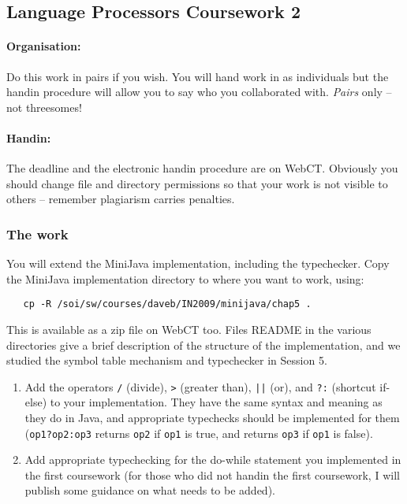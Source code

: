 \documentclass[11pt]{article}
\begin{document}
\subsection*{Language Processors Coursework 2}

\paragraph{Organisation:}
Do this work in pairs if you wish. You will hand
work in as individuals but the handin procedure will allow 
you to say who you collaborated with. 
\emph{Pairs} only -- not threesomes!

\paragraph{Handin:} 
The deadline and the electronic handin procedure are
on WebCT.
Obviously you should change file and directory permissions so 
that your work is not visible to others -- 
remember plagiarism carries penalties. 

\subsubsection*{The work}

You will extend the MiniJava implementation, including
the typechecker. Copy the MiniJava implementation directory
to where you want to work, using:  
\begin{verbatim}
   cp -R /soi/sw/courses/daveb/IN2009/minijava/chap5 .
\end{verbatim}
This is available as a zip file on WebCT too.
Files README in the various directories give a brief
description of the structure of the implementation,
and we studied the symbol table mechanism and 
typechecker in Session 5.

\begin{enumerate}
\item Add the operators \verb+/+ (divide), \verb+>+ (greater than),
\verb+||+ (or), and \verb+?:+ (shortcut if-else) to your implementation.
They have the same syntax and meaning as they do in Java, 
and appropriate typechecks should be implemented for them
(\verb+op1?op2:op3+ returns \verb+op2+ if \verb+op1+ is true,
and returns \verb+op3+ if \verb+op1+ is false).


\item Add appropriate typechecking for the do-while statement
you implemented in the first coursework (for those who did
not handin the first coursework, I will publish some
guidance on what needs to be added).
\end{enumerate}
\end{document}
